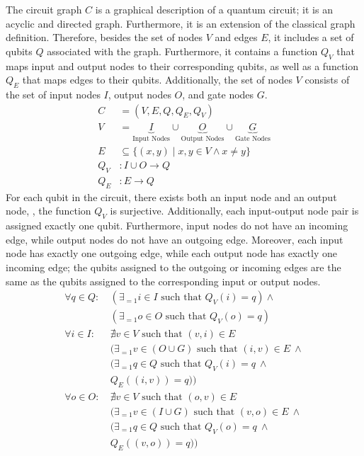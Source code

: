 The circuit graph $C$ is a graphical description of a quantum circuit; it is an acyclic and directed graph. Furthermore, it is an extension of the classical graph definition. Therefore, besides the set of nodes $V$ and edges $E$, it includes a set of qubits $Q$ associated with the graph. Furthermore, it contains a function $Q_V$ that maps input and output nodes to their corresponding qubits, as well as a function $Q_E$ that maps edges to their qubits. Additionally, the set of nodes $V$ consists of the set of input nodes $I$, output nodes $O$, and gate nodes $G$.
\begin{align*}
    C &= (V, E, Q, Q_E, Q_V)\\
    V &= \underbrace{I}_{\text{Input Nodes}} \cup \underbrace{O}_{\text{Output Nodes}} \cup \underbrace{G}_{\text{Gate Nodes}}\\
    E &\subseteq \{ (x, y) \mid x,y \in V \land x \neq y \}\\
    Q_V &: I \cup O \to Q \\
    Q_E &: E \to Q
\end{align*}
For each qubit in the circuit, there exists both an input node and an output node, \ie, the function $Q_V$ is surjective. Additionally, each input-output node pair is assigned exactly one qubit.
Furthermore, input nodes do not have an incoming edge, while output nodes do not have an outgoing edge. 
Moreover, each input node has exactly one outgoing edge, while each output node has exactly one incoming edge; the qubits assigned to the outgoing or incoming edges are the same as the qubits assigned to the corresponding input or output nodes.
\begin{align*}
    \forall q \in Q :\ & (\exists_{=1} i \in I \text{ such that } Q_V(i) = q) \land\\
                       & (\exists_{=1} o \in O \text{ such that } Q_V(o) = q) \\
    \forall i \in I :\ & \nexists v \in V \text{ such that } (v, i) \in E\\
                       & (\exists_{=1} v \in (O \cup G) \text{ such that } (i, v) \in E  \ \land\\
                       & (\exists_{=1} q \in Q \text{ such that } Q_V(i) = q \ \land \\
                       & Q_E((i, v)) = q))\\
    \forall o \in O :\ & \nexists v \in V \text{ such that } (o, v) \in E\\
                       & (\exists_{=1} v \in (I \cup G) \text{ such that } (v, o) \in E \ \land\\
                       & (\exists_{=1} q \in Q \text{ such that } Q_V(o) = q \ \land \\
                       & Q_E((v, o)) = q))
\end{align*}

